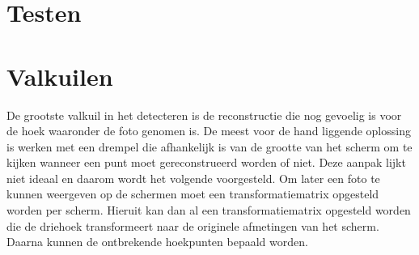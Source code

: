 \section{Testen} \label{Testen}


\section{Valkuilen} \label{Valkuilen}
De grootste valkuil in het detecteren is de reconstructie die nog gevoelig is voor de hoek waaronder de foto genomen is. De meest voor de hand liggende oplossing is werken met een drempel die afhankelijk is van de grootte van het scherm om te kijken wanneer een punt moet gereconstrueerd worden of niet. Deze aanpak lijkt niet ideaal en daarom wordt het volgende voorgesteld. Om later een foto te kunnen weergeven op de schermen moet een transformatiematrix opgesteld worden per scherm. Hieruit kan dan al een transformatiematrix opgesteld worden die de driehoek transformeert naar de originele afmetingen van het scherm. Daarna kunnen de ontbrekende hoekpunten bepaald worden. 